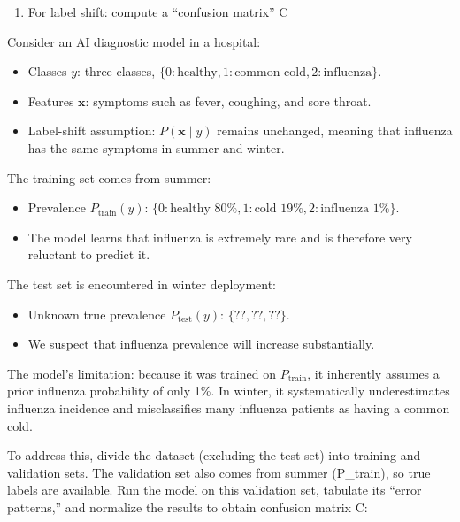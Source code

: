 \begin{enumerate}
\def\labelenumi{\arabic{enumi}.}
\setcounter{enumi}{1}
\tightlist
\item
  For label shift: compute a ``confusion matrix'' C
\end{enumerate}

Consider an AI diagnostic model in a hospital:

\begin{itemize}
\tightlist
\item
  Classes \(y\): three classes, \(\{0:\text{healthy},1:\text{common cold},2:\text{influenza}\}\).
\item
  Features \(\mathbf{x}\): symptoms such as fever, coughing, and sore throat.
\item
  Label-shift assumption: \(P(\mathbf{x}\mid y)\) remains unchanged, meaning that influenza has the same symptoms in summer and winter.
\end{itemize}

The training set comes from summer:

\begin{itemize}
\tightlist
\item
  Prevalence \(P_{\mathrm{train}}(y)\): \(\{0:\text{healthy }80\%,1:\text{cold }19\%,2:\text{influenza }1\%\}\).
\item
  The model learns that influenza is extremely rare and is therefore very reluctant to predict it.
\end{itemize}

The test set is encountered in winter deployment:

\begin{itemize}
\tightlist
\item
  Unknown true prevalence \(P_{\mathrm{test}}(y)\): \(\{??,??,??\}\).
\item
  We suspect that influenza prevalence will increase substantially.
\end{itemize}

The model's limitation: because it was trained on \(P_{\mathrm{train}}\), it inherently assumes a prior influenza probability of only 1\%. In winter, it systematically underestimates influenza incidence and misclassifies many influenza patients as having a common cold.

To address this, divide the dataset (excluding the test set) into training and validation sets. The validation set also comes from summer (P\_train), so true labels are available. Run the model on this validation set, tabulate its ``error patterns,'' and normalize the results to obtain confusion matrix C:

